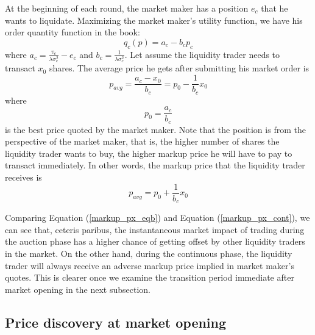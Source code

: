 \documentclass{article}
\begin{document}
At the beginning of each round, the market maker has a position $e_c$ that he wants to liquidate. Maximizing the market maker's utility function, we have his order quantity function in the book:
\[
  q_c(p) = a_c - b_c p_c
\]
where $a_c = \frac{v_c}{\lambda \sigma_c^2} - e_c$ and $b_c=\frac{1}{\lambda \sigma_c^2}$. Let assume the liquidity trader needs to transact $x_0$ shares. The average price he gets after submitting his market order is
\[
  p_{avg} = \frac{a_c-x_0}{b_c}=p_0 - \frac{1}{b_c} x_0
\]
where
\[
  p_0 = \frac{a_c}{b_c}
\]
is the best price quoted by the market maker. Note that the position is from the perspective of the market maker, that is, the higher number of shares the liquidity trader wants to buy, the higher markup price he will have to pay to transact immediately. In other words, the markup price that the liquidity trader receives is
\begin{equation}\label{markup_px_cont}
  p_{avg} = p_0 + \frac{1}{b_c} x_0
\end{equation}

Comparing Equation (\ref{markup_px_eqb}) and Equation (\ref{markup_px_cont}), we can see that, ceteris paribus, the instantaneous market impact of trading during the auction phase has a higher chance of getting offset by other liquidity traders in the market. On the other hand, during the continuous phase, the liquidity trader will always receive an adverse markup price implied in market maker's quotes. This is clearer once we examine the transition period immediate after market opening in the next subsection.

\subsection{Price discovery at market opening}\label{subsec:AnalyticalFrameworkTransitionPeriod}
\end{document}
